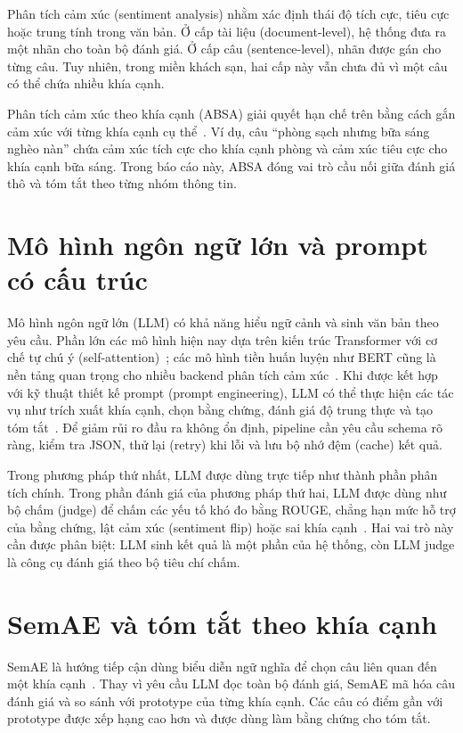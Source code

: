 \documentclass[12pt,a4paper]{report}
\begin{document}
Phân tích cảm xúc (sentiment analysis) nhằm xác định thái độ tích cực, tiêu cực hoặc trung tính trong văn bản. Ở cấp tài liệu (document-level), hệ thống đưa ra một nhãn cho toàn bộ đánh giá. Ở cấp câu (sentence-level), nhãn được gán cho từng câu. Tuy nhiên, trong miền khách sạn, hai cấp này vẫn chưa đủ vì một câu có thể chứa nhiều khía cạnh.

Phân tích cảm xúc theo khía cạnh (ABSA) giải quyết hạn chế trên bằng cách gắn cảm xúc với từng khía cạnh cụ thể~\cite{pontiki2014semeval}. Ví dụ, câu ``phòng sạch nhưng bữa sáng nghèo nàn'' chứa cảm xúc tích cực cho khía cạnh phòng và cảm xúc tiêu cực cho khía cạnh bữa sáng. Trong báo cáo này, ABSA đóng vai trò cầu nối giữa đánh giá thô và tóm tắt theo từng nhóm thông tin.

\section{Mô hình ngôn ngữ lớn và prompt có cấu trúc}

Mô hình ngôn ngữ lớn (LLM) có khả năng hiểu ngữ cảnh và sinh văn bản theo yêu cầu. Phần lớn các mô hình hiện nay dựa trên kiến trúc Transformer với cơ chế tự chú ý (self-attention)~\cite{vaswani2017attention}; các mô hình tiền huấn luyện như BERT cũng là nền tảng quan trọng cho nhiều backend phân tích cảm xúc~\cite{devlin2019bert}. Khi được kết hợp với kỹ thuật thiết kế prompt (prompt engineering), LLM có thể thực hiện các tác vụ như trích xuất khía cạnh, chọn bằng chứng, đánh giá độ trung thực và tạo tóm tắt~\cite{brown2020language,bhaskar2023prompted}. Để giảm rủi ro đầu ra không ổn định, pipeline cần yêu cầu schema rõ ràng, kiểm tra JSON, thử lại (retry) khi lỗi và lưu bộ nhớ đệm (cache) kết quả.

Trong phương pháp thứ nhất, LLM được dùng trực tiếp như thành phần phân tích chính. Trong phần đánh giá của phương pháp thứ hai, LLM được dùng như bộ chấm (judge) để chấm các yếu tố khó đo bằng ROUGE, chẳng hạn mức hỗ trợ của bằng chứng, lật cảm xúc (sentiment flip) hoặc sai khía cạnh~\cite{liu2023geval,zheng2023judging}. Hai vai trò này cần được phân biệt: LLM sinh kết quả là một phần của hệ thống, còn LLM judge là công cụ đánh giá theo bộ tiêu chí chấm.

\section{SemAE và tóm tắt theo khía cạnh}

SemAE là hướng tiếp cận dùng biểu diễn ngữ nghĩa để chọn câu liên quan đến một khía cạnh~\cite{basuroychowdhury2022sparse}. Thay vì yêu cầu LLM đọc toàn bộ đánh giá, SemAE mã hóa câu đánh giá và so sánh với prototype của từng khía cạnh. Các câu có điểm gần với prototype được xếp hạng cao hơn và được dùng làm bằng chứng cho tóm tắt.
\end{document}
